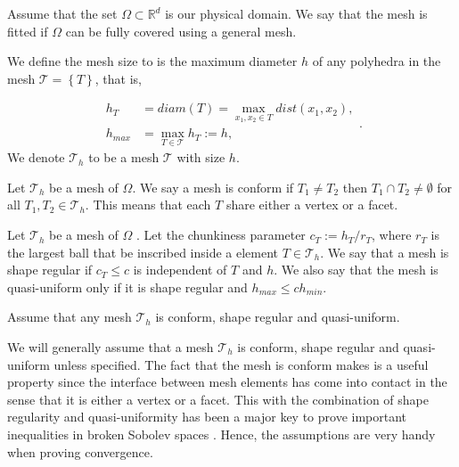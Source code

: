 \begin{definition}
   Assume that the set $\Omega \subset \mathbb{R} ^{d} $ is our physical domain.
   We say that the mesh is fitted if $\Omega $ can be fully covered using a general mesh.
\end{definition}

\begin{definition}
We define the mesh size to is the maximum diameter $h $ of any polyhedra in the mesh $\mathcal{T} = \left\{ T \right\}  $, that is,

\begin{equation}
\begin{split}
    h _{T} & = diam\left( T \right)   = \max_{x_1, x_{2} \in T} dist(x_{1}, x_{2}),  \\
    h_{max} &= \max_{T \in \mathcal{T} }  h_{T} := h,
\end{split}
.\end{equation}
We denote $\mathcal{T} _{h}$ to be a mesh $\mathcal{T} $ with size $h$.
\end{definition}

\begin{definition}
Let $\mathcal{T}_{h} $ be a mesh of $\Omega $. We say a mesh is conform if $T_{1} \neq T_{2 }$  then $T_{1} \cap T_{2} \neq \emptyset  $ for all $T_{1}, T_{2} \in \mathcal{T}_{h}$. This means that each $T$ share either a vertex or a facet.
\end{definition}

\begin{definition}
Let $\mathcal{T}_{h} $ be a mesh of $\Omega $ .
Let the chunkiness parameter $c_{T} := h_{T}/r_{T}$, where $r_{T}$  is the largest ball that be inscribed inside a element $T \in \mathcal{T}_{h} $.
We say that a mesh is shape regular if $c_{T}\le  c$ is independent of $T$  and $h$. We also say that the mesh is quasi-uniform only if it is shape regular and $h_{max} \le  c h_{min}$.
\end{definition}

\begin{assumption}
Assume that any mesh $\mathcal{T}_{h} $ is conform, shape regular and quasi-uniform.
\end{assumption}





We will generally assume that a mesh $\mathcal{T}_{h} $ is conform, shape regular and quasi-uniform unless specified.
 The fact that the mesh is conform makes is a useful property since the interface between mesh elements has come into contact in the sense
that it is either a vertex or a facet. This with the combination of shape regularity and quasi-uniformity has been a major key to prove important inequalities in broken Sobolev spaces \cite[Chapter 1.4.1]{pietro2012}. Hence, the assumptions are
very handy when proving convergence.

